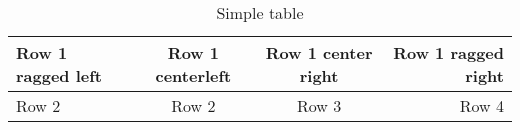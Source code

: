 \documentclass[12pt]{article}
\begin{document}
\blindtext
\begin{table}[h]
\begin{center}
	\begin{tabular}{l|c|c|r}
		Row 1 ragged left  & Row 1 centerleft & Row 1 center right & Row 1 ragged right \\ 
		\hline
		Row 2 & Row 2 & Row 3 & Row 4  \\
	\end{tabular}
\end{center}
\caption{Simple table}
\label{tab: simple table}
\end{table}
\blindtext
\listoftables
\end{document}
